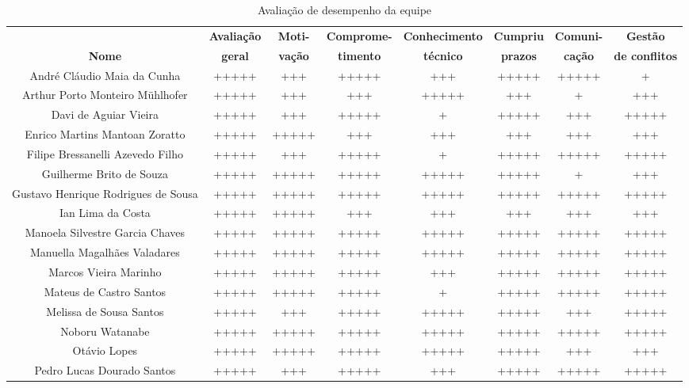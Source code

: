 \begin{landscape}
\begin{table}[htpb]
\begin{center}
\caption{Avaliação de desempenho da equipe}
\begin{tabular}{|c|c|c|c|c|c|c|c|}
\hline
 & \textbf{Avaliação} & \textbf{Moti-} & \textbf{Comprome-} & \textbf{Conhecimento} & \textbf{Cumpriu} & \textbf{Comuni-} & \textbf{Gestão} \\
 \textbf{Nome} & \textbf{geral} & \textbf{vação} & \textbf{timento} & \textbf{técnico} & \textbf{prazos} & \textbf{cação} & \textbf{de conflitos} \\ \hline
André Cláudio Maia da Cunha & +++++ & +++ & +++++ & +++ & +++++ & +++++ & + \\ \hline
Arthur Porto Monteiro Mühlhofer & +++++ & +++ & +++ & +++++ & +++ & + & +++ \\ \hline
Davi de Aguiar Vieira & +++++ & +++ & +++++ & + & +++++ & +++ & +++++ \\ \hline
Enrico Martins Mantoan Zoratto & +++++ & +++++ & +++ & +++ & +++ & +++ & +++ \\ \hline
Filipe Bressanelli Azevedo Filho & +++++ & +++ & +++++ & + & +++++ & +++++ & +++++ \\ \hline
Guilherme Brito de Souza & +++++ & +++++ & +++++ & +++++ & +++++ & + & +++ \\ \hline
Gustavo Henrique Rodrigues de Sousa & +++++ & +++++ & +++++ & +++++ & +++++ & +++++ & +++++ \\ \hline
Ian Lima da Costa & +++++ & +++++ & +++ & +++ & +++ & +++ & +++ \\ \hline
Manoela Silvestre Garcia Chaves & +++++ & +++++ & +++++ & +++++ & +++++ & +++++ & +++++ \\ \hline
Manuella Magalhães Valadares & +++++ & +++++ & +++++ & +++++ & +++++ & +++++ & +++++ \\ \hline
Marcos Vieira Marinho & +++++ & +++++ & +++++ & +++ & +++++ & +++++ & +++++ \\ \hline
Mateus de Castro Santos & +++++ & +++++ & +++++ & + & +++++ & +++++ & +++++ \\ \hline
Melissa de Sousa Santos & +++++ & +++ & +++++ & +++++ & +++++ & +++ & +++++ \\ \hline
Noboru Watanabe & +++++ & +++++ & +++++ & +++++ & +++++ & +++++ & +++++ \\ \hline
Otávio Lopes & +++++ & +++++ & +++++ & +++++ & +++++ & +++ & +++ \\ \hline
Pedro Lucas Dourado Santos & +++++ & +++ & +++++ & +++ & +++++ & +++++ & +++++ \\ \hline

\end{tabular}
\end{center}
\end{table}
\end{landscape}
